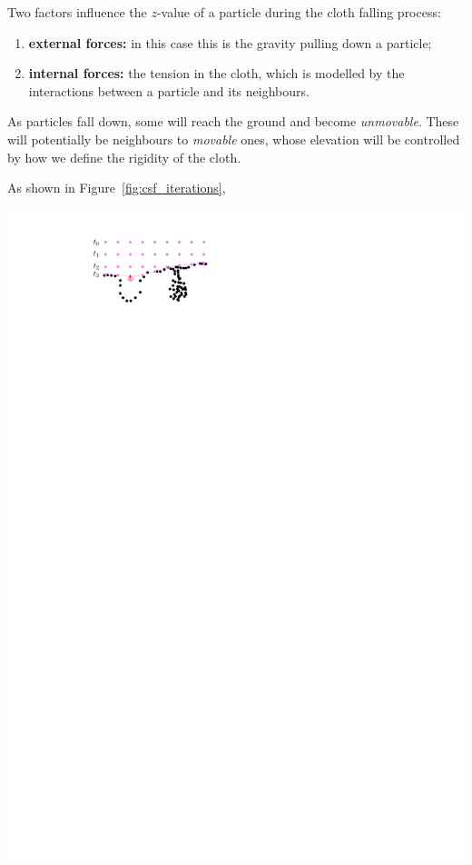 Two factors influence the $z$-value of a particle during the cloth falling process:
\begin{enumerate}
  \item \textbf{external forces:} in this case this is the gravity pulling down a particle;
  \item \textbf{internal forces:} the tension in the cloth, which is modelled by the interactions between a particle and its neighbours.
\end{enumerate}
As particles fall down, some will reach the ground and become \emph{unmovable}.
These will potentially be neighbours to \emph{movable} ones, whose elevation will be controlled by how we define the rigidity of the cloth.

As shown in Figure~\ref{fig:csf_iterations},
\begin{marginfigure}
  \centering
  \includegraphics[width=\linewidth]{csf_iterations}
  \caption{}%
\label{fig:csf_iterations}
\end{marginfigure}
